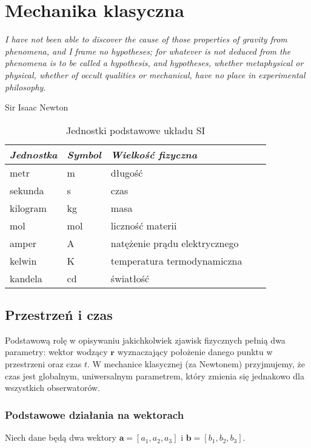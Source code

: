 \documentclass[../main.tex]{subfiles}
\begin{document}
\section{Mechanika klasyczna}
\textit{I have not been able to discover the cause of those properties of gravity from phenomena,
and I frame no hypotheses; for whatever is not deduced from the phenomena is to be called a
hypothesis, and hypotheses, whether metaphysical or physical, whether of occult qualities or
mechanical, have no place in experimental philosophy.}\begin{flushright}Sir Isaac
Newton\end{flushright}

\begin{table}[h]
    \centering
    \begin{tabular}{ *5l }\toprule \emph{Jednostka} & \emph{Symbol} & \emph{Wielkość fizyczna}
    \\\midrule metr    & m  & długość   \\ 
    sekunda  & s & czas  \\ 
    kilogram  & kg & masa  \\
    mol     & mol  & liczność materii   \\ 
    amper  & A & natężenie prądu elektrycznego\\ 
    kelwin & K & temperatura termodynamiczna  \\
    kandela & cd & światłość\\
    \bottomrule
    \hline
\end{tabular}
\caption{Jednostki podstawowe układu SI}
\end{table}
\subsection{Przestrzeń i czas}
Podstawową rolę w opisywaniu jakichkolwiek zjawisk fizycznych pełnią dwa parametry: wektor wodzący
\(\mathbf{r}\) wyznaczający położenie danego punktu w przestrzeni oraz czas \(t\). W mechanice
klasycznej (za Newtonem) przyjmujemy, że czas jest globalnym, uniwersalnym parametrem, który zmienia
się jednakowo dla wszystkich obserwatorów.
\subsubsection{Podstawowe działania na wektorach}
Niech dane będą dwa wektory \(\mathbf{a}=[a_1,a_2,a_3]\) i \(\mathbf{b}=[b_1,b_2,b_3]\).
\end{document}
